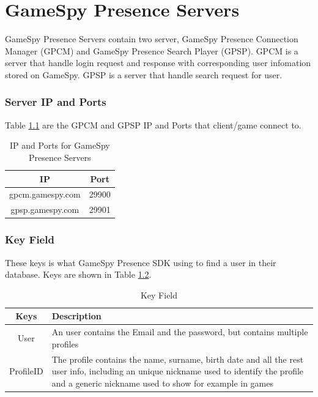 \documentclass[oneside,titlepage,a4paper]{report} %
\begin{document}
\chapter{GameSpy Presence Servers}
\par GameSpy Presence Servers contain two server, GameSpy Presence Connection Manager (GPCM) and GameSpy Presence Search Player (GPSP). GPCM is a server that handle login request and response with corresponding user infomation stored on GameSpy. GPSP is a server that handle search request for user.
\subsection{Server IP and Ports}
Table \ref{IP and Ports for GameSpy Presence Servers} are the GPCM and GPSP IP and Ports that client/game connect to.
\begin{table}[H]
	\centering
	\begin{tabular}{|c|c|}
		\hline 
		IP&Port  \\ 
		\hline 
		gpcm.gamespy.com&29900 \\ 		
		\hline 
	 	gpsp.gamespy.com&29901 \\
	 	\hline 
	\end{tabular} 
\caption{IP and Ports for GameSpy Presence Servers}
\label{IP and Ports for GameSpy Presence Servers}

\end{table}

\subsection{Key Field}
These keys is what GameSpy Presence SDK using to find a user in their database. Keys are shown in Table \ref{Key Field}.

\begin{table}[H]
	\centering
	\begin{tabular}{|c|>{\centering\arraybackslash}p{8cm}|}
		\hline 
		Keys& Description  \\ 
		\hline 
		User & An user contains the Email and the password, but contains multiple profiles \\ 		
		\hline 
		ProfileID & The profile contains the name, surname, birth date and all the rest user info, including
		an unique nickname used to identify the profile and a generic nickname used to show for example in
		games \\
		\hline 
	\end{tabular} 
	\caption{Key Field}
	\label{Key Field}	
\end{table}
\end{document}
